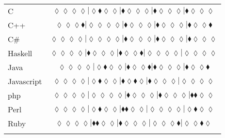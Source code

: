 \begin{table*}
{\begin{tabular}{l c}
C & $\scriptscriptstyle\lozenge\lozenge\lozenge\lozenge|\lozenge\blacklozenge\lozenge\lozenge|\blacklozenge\lozenge\lozenge\lozenge|\blacklozenge\lozenge\lozenge\lozenge|\blacklozenge\lozenge\lozenge\lozenge$ \\
C++ & $\scriptscriptstyle\lozenge\lozenge\lozenge\blacklozenge|\lozenge\lozenge\lozenge\lozenge|\blacklozenge\lozenge\lozenge\lozenge|\blacklozenge\lozenge\lozenge\lozenge|\blacklozenge\lozenge\lozenge\blacklozenge$ \\
C\# & $\scriptscriptstyle\lozenge\lozenge\lozenge\lozenge|\lozenge\lozenge\lozenge\lozenge|\blacklozenge\lozenge\lozenge\lozenge|\blacklozenge\lozenge\lozenge\lozenge|\blacklozenge\lozenge\lozenge\lozenge$ \\
Haskell & $\scriptscriptstyle\lozenge\lozenge\lozenge\lozenge|\blacklozenge\lozenge\lozenge\lozenge|\blacklozenge\lozenge\lozenge\blacklozenge|\lozenge\lozenge\lozenge\lozenge|\lozenge\lozenge\lozenge\lozenge$ \\
Java & $\scriptscriptstyle\lozenge\lozenge\lozenge\lozenge|\lozenge\blacklozenge\lozenge\lozenge|\blacklozenge\lozenge\lozenge\blacklozenge|\blacklozenge\lozenge\lozenge\lozenge|\blacklozenge\lozenge\lozenge\blacklozenge$ \\
Javascript & $\scriptscriptstyle\lozenge\lozenge\lozenge\lozenge|\lozenge\blacklozenge\lozenge\lozenge|\blacklozenge\lozenge\blacklozenge\lozenge|\blacklozenge\lozenge\lozenge\lozenge|\lozenge\lozenge\lozenge\lozenge$ \\
{\sc php} & $\scriptscriptstyle\lozenge\lozenge\lozenge\lozenge|\lozenge\lozenge\lozenge\lozenge|\blacklozenge\lozenge\lozenge\lozenge|\blacklozenge\lozenge\lozenge\lozenge|\blacklozenge\blacklozenge\lozenge\lozenge$ \\
Perl & $\scriptscriptstyle\lozenge\lozenge\lozenge\lozenge|\lozenge\blacklozenge\lozenge\lozenge|\blacklozenge\blacklozenge\lozenge\lozenge|\lozenge\lozenge\lozenge\lozenge|\lozenge\blacklozenge\lozenge\lozenge$ \\
Ruby & $\scriptscriptstyle\lozenge\lozenge\lozenge\lozenge|\blacklozenge\blacklozenge\lozenge\lozenge|\blacklozenge\lozenge\lozenge\lozenge|\lozenge\lozenge\lozenge\blacklozenge|\lozenge\lozenge\blacklozenge\lozenge$ \\

\hline
& \\
\end{tabular}
}
\end{table*}
